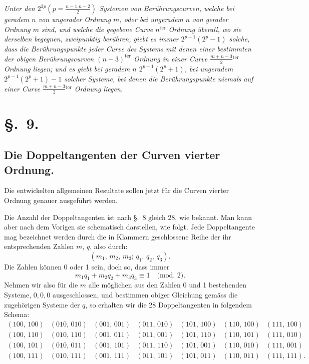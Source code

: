 \documentclass{article}
\begin{document}
\emph{Unter den $2^{2p}\left(p = \frac{n-1.n-2}{2}\right)$ Systemen von Berührungscurven, welche bei geradem $n$ von ungerader Ordnung $m$, oder bei ungeradem $n$ von gerader Ordnung $m$ sind, und welche die gegebene Curve $n^{\text{ter}}$ Ordnung überall, wo sie derselben begegnen, zweipunktig berühren, giebt es immer $2^{p-1}(2^{p}-1)$ solche, dass die Berührungspunkte jeder Curve des Systems mit denen einer bestimmten der obigen Berührungscurven $(n-3)^{\text{ter}}$ Ordnung in einer Curve $\frac{m+n-3}{2}{}^{\text{ter}}$ Ordnung liegen; und es giebt bei geradem $n$ $2^{p-1}(2^{p}+1)$, bei ungeradem $2^{p-1}(2^{p}+1)-1$ solcher Systeme, bei denen die Berührungspunkte niemals auf einer Curve $\frac{m+n-3}{2}{}^{\text{ter}}$ Ordnung liegen.}

\section*{§.~9.}

\subsection*{Die Doppeltangenten der Curven vierter Ordnung.}

Die entwickelten allgemeinen Resultate sollen jetzt für die Curven vierter Ordnung genauer ausgeführt werden.

Die Anzahl der Doppeltangenten ist nach §.~8 gleich 28, wie bekannt. Man kann aber nach dem Vorigen sie schematisch darstellen, wie folgt. Jede Doppeltangente mag bezeichnet werden durch die in Klammern geschlossene Reihe der ihr entsprechenden Zahlen $m$, $q$, also durch:
\[
(m_{1},\, m_{2},\, m_{3};\, q_{1},\, q_{2},\, q_{3}).
\]
Die Zahlen können 0 oder 1 sein, doch so, dass immer
\[
m_{1}q_{1}+m_{2}q_{2}+m_{3}q_{3} \equiv 1 \quad \text{(mod.\ 2)}.
\]
Nehmen wir also für die $m$ alle möglichen aus den Zahlen 0 und 1 bestehenden Systeme, $0,0,0$ ausgeschlossen, und bestimmen obiger Gleichung gemäss die zugehörigen Systeme der $q$, so erhalten wir die 28 Doppeltangenten in folgendem Schema:
\[
\begin{array}{ccccccc}
(100,\,100) & (010,\,010) & (001,\,001) & (011,\,010) & (101,\,100) & (110,\,100) & (111,\,100)\\
(100,\,110) & (010,\,110) & (001,\,011) & (011,\,001) & (101,\,110) & (110,\,101) & (111,\,010)\\
(100,\,101) & (010,\,011) & (001,\,101) & (011,\,110) & (101,\,001) & (110,\,010) & (111,\,001)\\
(100,\,111) & (010,\,111) & (001,\,111) & (011,\,101) & (101,\,011) & (110,\,011) & (111,\,111).
\end{array}
\]
\end{document}
